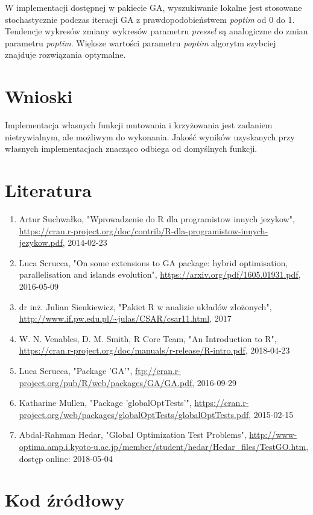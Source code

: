 \documentclass{article}
\begin{document}
W implementacji dostępnej w pakiecie GA, wyszukiwanie lokalne jest stosowane stochastycznie podczas iteracji GA z prawdopodobieństwem \textit{poptim}  od 0 do 1. Tendencje wykresów zmiany wykresów parametru \textit{pressel} są analogiczne do zmian parametru \textit{poptim}. Większe wartości parametru \textit{poptim} algorytm szybciej znajduje rozwiązania optymalne.
        
    
    \clearpage
\section{Wnioski}

Implementacja własnych funkcji mutowania i krzyżowania jest  zadaniem nietrywialnym, ale możliwym do wykonania.  Jakość wyników uzyskanych przy własnych implementacjach znacząco odbiega od domyślnych funkcji.



\section{Literatura}
\begin{enumerate}
\item Artur Suchwałko, "Wprowadzenie do R dla programistow innych jezykow", \url{https://cran.r-project.org/doc/contrib/R-dla-programistow-innych-jezykow.pdf}, 2014-02-23
\item Luca Scrucca, "On some extensions to GA package:
hybrid optimisation, parallelisation and islands evolution", \url{https://arxiv.org/pdf/1605.01931.pdf}, 2016-05-09
\item dr inż. Julian Sienkiewicz, "Pakiet R w analizie układów złożonych", \url{http://www.if.pw.edu.pl/~julas/CSAR/csar11.html}, 2017
\item W. N. Venables, D. M. Smith, R Core Team, "An Introduction to R", \url{https://cran.r-project.org/doc/manuals/r-release/R-intro.pdf}, 2018-04-23
\item Luca Scrucca, "Package 'GA'", \url{ftp://cran.r-project.org/pub/R/web/packages/GA/GA.pdf}, 2016-09-29
\item Katharine Mullen, "Package 'globalOptTests'", \url{https://cran.r-project.org/web/packages/globalOptTests/globalOptTests.pdf},
2015-02-15
\item Abdal-Rahman Hedar, "Global Optimization Test Problems", \url{http://www-optima.amp.i.kyoto-u.ac.jp/member/student/hedar/Hedar_files/TestGO.htm}, dostęp online: 2018-05-04
\end{enumerate}


\newpage
\section{Kod źródłowy}
\lstset{
language=R,
extendedchars=true,
inputencoding=latin1,
basicstyle=\small
}





\end{document}
